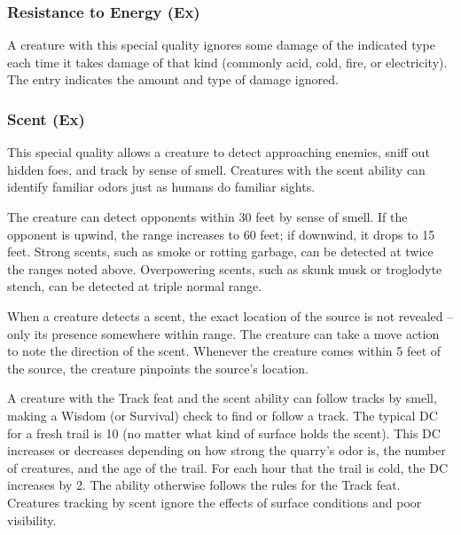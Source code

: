 \subsubsection{Resistance to Energy (Ex)} A creature with this special quality ignores some damage of the indicated type each time it takes damage of that kind (commonly acid, cold, fire, or electricity). The entry indicates the amount and type of damage ignored.

\subsubsection{Scent (Ex)} This special quality allows a creature to detect approaching enemies, sniff out hidden foes, and track by sense of smell. Creatures with the scent ability can identify familiar odors just as humans do familiar sights.

The creature can detect opponents within 30 feet by sense of smell. If the opponent is upwind, the range increases to 60 feet; if downwind, it drops to 15 feet. Strong scents, such as smoke or rotting garbage, can be detected at twice the ranges noted above. Overpowering scents, such as skunk musk or troglodyte stench, can be detected at triple normal range.

When a creature detects a scent, the exact location of the source is not revealed -- only its presence somewhere within range. The creature can take a move action to note the direction of the scent. Whenever the creature comes within 5 feet of the source, the creature pinpoints the source's location.

A creature with the Track feat and the scent ability can follow tracks by smell, making a Wisdom (or Survival) check to find or follow a track. The typical DC for a fresh trail is 10 (no matter what kind of surface holds the scent). This DC increases or decreases depending on how strong the quarry's odor is, the number of creatures, and the age of the trail. For each hour that the trail is cold, the DC increases by 2. The ability otherwise follows the rules for the Track feat. Creatures tracking by scent ignore the effects of surface conditions and poor visibility. 

